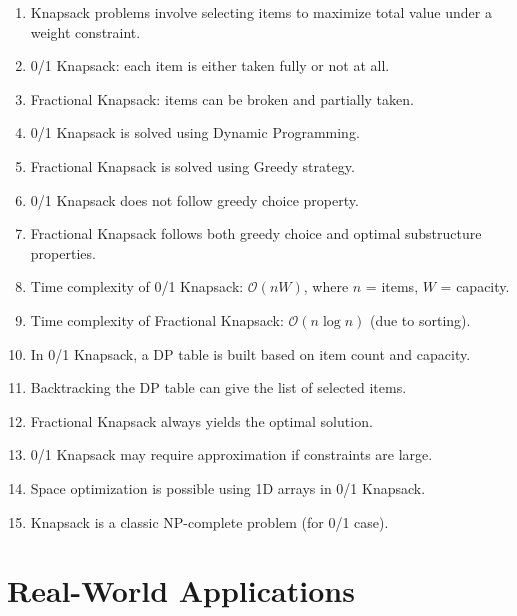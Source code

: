 \documentclass[14pt]{extarticle}
\begin{document}
\begin{enumerate}
    \item Knapsack problems involve selecting items to maximize total value under a weight constraint.
    \item 0/1 Knapsack: each item is either taken fully or not at all.
    \item Fractional Knapsack: items can be broken and partially taken.
    \item 0/1 Knapsack is solved using Dynamic Programming.
    \item Fractional Knapsack is solved using Greedy strategy.
    \item 0/1 Knapsack does not follow greedy choice property.
    \item Fractional Knapsack follows both greedy choice and optimal substructure properties.
    \item Time complexity of 0/1 Knapsack: $\mathcal{O}(nW)$, where $n$ = items, $W$ = capacity.
    \item Time complexity of Fractional Knapsack: $\mathcal{O}(n \log n)$ (due to sorting).
    \item In 0/1 Knapsack, a DP table is built based on item count and capacity.
    \item Backtracking the DP table can give the list of selected items.
    \item Fractional Knapsack always yields the optimal solution.
    \item 0/1 Knapsack may require approximation if constraints are large.
    \item Space optimization is possible using 1D arrays in 0/1 Knapsack.
    \item Knapsack is a classic NP-complete problem (for 0/1 case).
\end{enumerate}

\newpage
\section{Real-World Applications}
\end{document}
